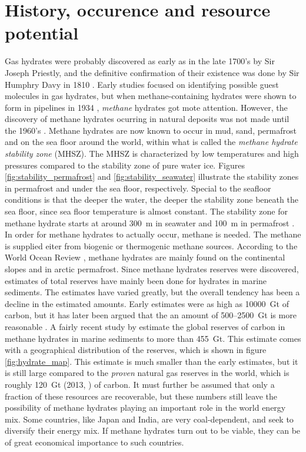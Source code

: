 \section{History, occurence and resource potential}
Gas hydrates were probably discovered as early as in the late 1700's by Sir Joseph Priestly, and the definitive confirmation of their existence was done by Sir Humphry Davy in 1810 \cite{Hester2009}. Early studies focused on identifying possible guest molecules in gas hydrates, but when methane-containing hydrates were shown to form in pipelines in 1934 \cite{Hammerschmidt1934}, \emph{methane} hydrates got mote attention. However, the discovery of methane hydrates ocurring in natural deposits was not made until the 1960's \cite{Makogon200714}. Methane hydrates are now known to occur in mud, sand, permafrost and on the sea floor around the world, within what is called the \emph{methane hydrate stability zone} (MHSZ). The MHSZ is characterized by low temperatures and high pressures compared to the stability zone of pure water ice. Figures \ref{fig:stability_permafrost} and \ref{fig:stability_seawater} illustrate the stability zones in permafrost and under the sea floor, respectively. Special to the seafloor conditions is that the deeper the water, the deeper the stability zone beneath the sea floor, since sea floor temperature is almost constant. The stability zone for methane hydrate starts at around \SI{300}{\meter} in seawater and \SI{100}{\meter} in permafrost \cite{Hester2009}. In order for methane hydrates to actually occur, methane is needed. The methane is supplied eiter from biogenic or thermogenic methane sources. According to the World Ocean Review \cite{Bucker2014}, methane hydrates are mainly found on the continental slopes and in arctic permafrost.  Since methane hydrates reserves were discovered, estimates of total reserves have mainly been done for hydrates in marine sediments. The estimates have varied greatly, but the overall tendency has been a decline in the estimated amounts. Early estimates were as high as \SI{10000}{\giga\tonne} of carbon, but it has later been argued that the an amount of 500–\SI{2500}{\giga\tonne} is more reasonable \cite{Milkov2004183}. A fairly recent study by \citet{Wallmann2012} estimate the global reserves of carbon in methane hydrates in marine sediments to more than \SI{455}{\giga\tonne}. This estimate comes with a geographical distribution of the reserves, which is shown in figure \ref{fig:hydrate_map}. This estimate is much smaller than the early estimates, but it is still large compared to the \emph{proven} natural gas reserves in the world, which is roughly \SI{120}{\giga\tonne} (2013, \cite{CIA2013}) of carbon. It must further be assumed that only a fraction of these resources are recoverable, but these numbers still leave the possibility of methane hydrates playing an important role in the world energy mix. Some countries, like Japan and India, are very coal-dependent, and seek to diversify their energy mix. If methane hydrates turn out to be viable, they can be of great economical importance to such countries. 



